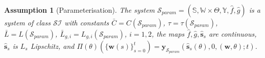 \documentclass{ifacconf}
\def\rvs{{\mathbf{s}}}
\def\rvw{{\mathbf{w}}}
\def\rvy{{\mathbf{y}}}
\def\vs{{\bm{s}}}
\def\vv{{\bm{v}}}
\def\sS{{\mathbb{S}}}
\def\sW{{\mathbb{W}}}
\def\sY{{\mathbb{Y}}}
\def\sZ{{\mathbb{Z}}}
\newcommand{\reals}{\mathbb{R}}
\newtheorem{Assumption}{Assumption}[section]
\newcommand{\class}{\(\mathcal{SI}\)}
\begin{document}
	\begin{Assumption}[Parameterisation] \label{as:parametrisation}
 The system $\mathcal{S}_{param}=(\sS,\sW \times \Theta, \sY,\hat{f},\hat{g})$ 
 is a system of class \class{} with constants $\bar{C}=C(\mathcal{S}_{param})$, $\tau=\tau(\mathcal{S}_{param})$, $\bar{L}=L(\mathcal{S}_{param})$, 
 $\bar{L}_{g,i}=L_{g,i}(\mathcal{S}_{param})$, $i=1,2$, 
 the maps $\hat{f},\hat{g},\hat{\vs}_s$ are continuous, $\hat{\vs}_s$ is $L_s$ Lipschitz, and 
 $\Pi(\theta)(\{\rvw(s)\}_{s=0}^{t})=\rvy_{\mathcal{S}_{param}}(\hat{\vs}_s(\theta),0,(\rvw,\theta);t)$.

\end{Assumption}
\end{document}
